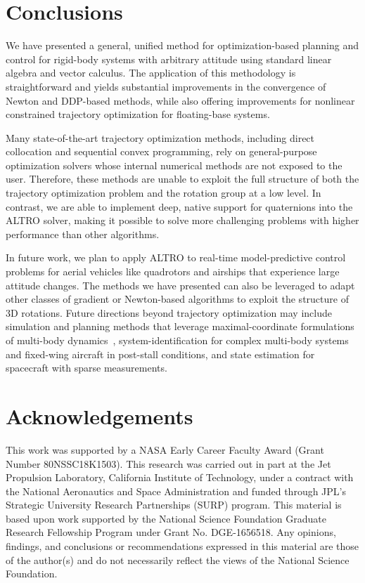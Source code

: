 \documentclass[letterpaper, 10 pt, conference]{ieeeconf}  %
\begin{document}
\section{Conclusions} \label{sec:conclusion}
    We have presented a general, unified method for optimization-based planning and control for rigid-body
    systems with arbitrary attitude using standard linear algebra and vector calculus.
    The application of this methodology is straightforward and
    yields substantial improvements in the convergence of Newton and DDP-based methods, while also offering improvements for nonlinear constrained
    trajectory optimization for floating-base systems.
    
    Many state-of-the-art trajectory optimization methods, including direct collocation and sequential convex programming, rely on general-purpose optimization solvers whose internal numerical methods are not exposed to the user. Therefore, these methods are unable to exploit the full structure of both the trajectory optimization problem and the rotation group at a low level. In contrast, we are able to implement deep, native support for quaternions into the ALTRO solver, making it possible to solve more challenging problems with higher performance than other algorithms.

    In future work, we plan to apply ALTRO to real-time model-predictive control problems for aerial vehicles like quadrotors and airships that experience large attitude changes. The methods we have presented can also be leveraged to adapt other classes of gradient or Newton-based algorithms to exploit the structure of 3D rotations. Future directions beyond trajectory optimization may include simulation and planning methods that leverage maximal-coordinate formulations of multi-body dynamics~\cite{brudigam2020linear}, system-identification for complex multi-body systems and fixed-wing aircraft in post-stall conditions, and state estimation for spacecraft with sparse measurements. 

\section*{Acknowledgements}
This work was supported by a NASA Early Career Faculty Award (Grant Number 80NSSC18K1503).
This research was carried out in part at the Jet Propulsion Laboratory, California Institute of Technology, under a contract with the National Aeronautics and Space Administration and funded through JPL’s Strategic University Research Partnerships (SURP) program.
This material is based upon work supported by the National Science Foundation Graduate
Research Fellowship Program under Grant No. DGE-1656518. Any opinions, findings, and
conclusions or recommendations expressed in this material are those of the author(s) and
do not necessarily reflect the views of the National Science Foundation.


\printbibliography
\end{document}
